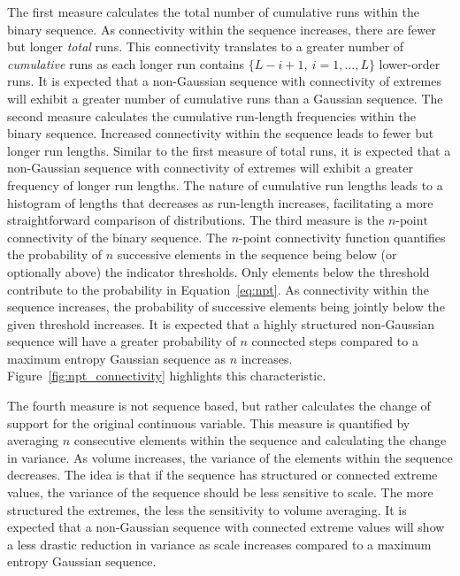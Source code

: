 The first measure calculates the total number of cumulative runs within the binary sequence. As connectivity within the sequence increases, there are fewer but longer \emph{total} runs. This connectivity translates to a greater number of \emph{cumulative} runs as each longer run contains $\{L-i+1, \ i=1,\dots,L\}$ lower-order runs. It is expected that a non-Gaussian sequence with connectivity of extremes will exhibit a greater number of cumulative runs than a Gaussian sequence. The second measure calculates the cumulative run-length frequencies within the binary sequence. Increased connectivity within the sequence leads to fewer but longer run lengths. Similar to the first measure of total runs, it is expected that a non-Gaussian sequence with connectivity of extremes will exhibit a greater frequency of longer run lengths. The nature of cumulative run lengths leads to a histogram of lengths that decreases as run-length increases, facilitating a more straightforward comparison of distributions. The third measure is the $n\text{-point}$ connectivity of the binary sequence. The $n\text{-point}$ connectivity function quantifies the probability of $n$ successive elements in the sequence being below (or optionally above) the indicator thresholds. Only elements below the threshold contribute to the probability in Equation~\ref{eq:npt}. As connectivity within the sequence increases, the probability of successive elements being jointly below the given threshold increases. It is expected that a highly structured non-Gaussian sequence will have a greater probability of $n$ connected steps compared to a maximum entropy Gaussian sequence as $n$ increases. Figure~\ref{fig:npt_connectivity} highlights this characteristic.

The fourth measure is not sequence based, but rather calculates the change of support for the original continuous variable. This measure is quantified by averaging $n$ consecutive elements within the sequence and calculating the change in variance. As volume increases, the variance of the elements within the sequence decreases. The idea is that if the sequence has structured or connected extreme values, the variance of the sequence should be less sensitive to scale. The more structured the extremes, the less the sensitivity to volume averaging. It is expected that a non-Gaussian sequence with connected extreme values will show a less drastic reduction in variance as scale increases compared to a maximum entropy Gaussian sequence.

